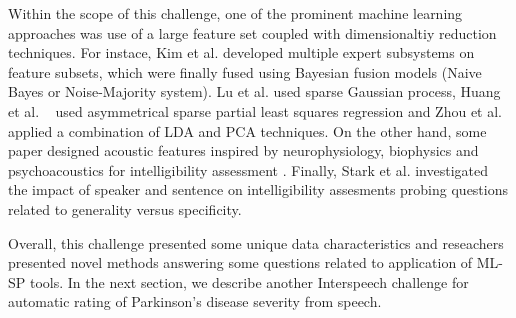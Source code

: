 \documentclass{article}
\begin{document}
Within the scope of this challenge, one of the prominent machine learning approaches was use of a large feature set coupled with dimensionaltiy reduction techniques. 
For instace, Kim et al. \cite{kim2012intelligibility} developed multiple expert subsystems on feature subsets, which were finally fused using Bayesian fusion models (Naive Bayes or Noise-Majority system).
Lu et al. \cite{lu2012predicting} used sparse Gaussian process, Huang et al. ~\cite{huang2012detecting} used asymmetrical sparse partial least squares regression and Zhou et al. \cite{zhou2012automatic} applied a combination of LDA and PCA techniques.
On the other hand, some paper designed acoustic features inspired by neurophysiology, biophysics and psychoacoustics for intelligibility assessment \cite{zhou2012automatic}. 
Finally, Stark et al. \cite{stark2012interspeech} investigated the impact of speaker and sentence on intelligibility assesments probing questions related to generality versus specificity.

Overall, this challenge presented some unique data characteristics and reseachers presented novel methods answering some questions related to application of ML-SP tools.
In the next section, we describe another Interspeech challenge for automatic rating of Parkinson's disease severity from speech. 


\end{document}

